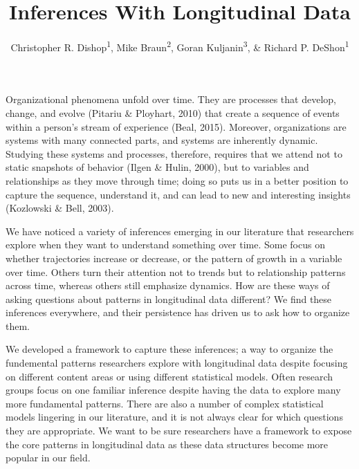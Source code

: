 \documentclass[english,,man]{apa6}
\title{Inferences With Longitudinal Data}
\author{Christopher R. Dishop\textsuperscript{1}, Mike Braun\textsuperscript{2},
Goran Kuljanin\textsuperscript{3}, \& Richard P.
DeShon\textsuperscript{1}}
\date{}
\affiliation{
\vspace{0.5cm}
\textsuperscript{1} Michigan State University\\\textsuperscript{2} University of South Florida\\\textsuperscript{3} DePaul University}
\theoremstyle{definition}
\theoremstyle{definition}
\theoremstyle{definition}
\theoremstyle{remark}
\begin{document}
\maketitle

Organizational phenomena unfold over time. They are processes that
develop, change, and evolve (Pitariu \& Ployhart, 2010) that create a
sequence of events within a person's stream of experience (Beal, 2015).
Moreover, organizations are systems with many connected parts, and
systems are inherently dynamic. Studying these systems and processes,
therefore, requires that we attend not to static snapshots of behavior
(Ilgen \& Hulin, 2000), but to variables and relationships as they move
through time; doing so puts us in a better position to capture the
sequence, understand it, and can lead to new and interesting insights
(Kozlowski \& Bell, 2003).

We have noticed a variety of inferences emerging in our literature that
researchers explore when they want to understand something over time.
Some focus on whether trajectories increase or decrease, or the pattern
of growth in a variable over time. Others turn their attention not to
trends but to relationship patterns across time, whereas others still
emphasize dynamics. How are these ways of asking questions about
patterns in longitudinal data different? We find these inferences
everywhere, and their persistence has driven us to ask how to organize
them.

We developed a framework to capture these inferences; a way to organize
the fundemental patterns researchers explore with longitudinal data
despite focusing on different content areas or using different
statistical models. Often research groups focus on one familiar
inference despite having the data to explore many more fundamental
patterns. There are also a number of complex statistical models
lingering in our literature, and it is not always clear for which
questions they are appropriate. We want to be sure researchers have a
framework to expose the core patterns in longitudinal data as these data
structures become more popular in our field.
\end{document}

